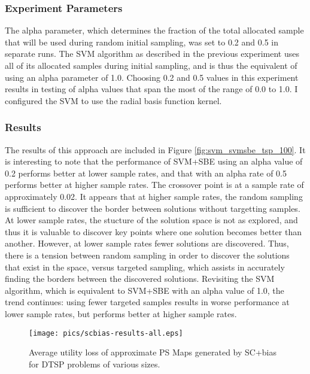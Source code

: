 \subsubsection{Experiment Parameters} 

The alpha parameter, which determines the fraction of the total allocated sample that will be used during random initial sampling, was set to 0.2 and 0.5 in separate runs.  The SVM algorithm as described in the previous experiment uses all of its allocated samples during initial sampling, and is thus the equivalent of using an alpha parameter of 1.0.  Choosing 0.2 and 0.5 values in this experiment results in testing of alpha values that span the most of the range of 0.0 to 1.0.  I configured the SVM to use the radial basis function kernel.

\subsubsection{Results} The results of this approach are included in Figure \ref{fig:svm_svmsbe_tsp_100}.  It is interesting to note that the performance of SVM+SBE using an alpha value of 0.2 performs better at lower sample rates, and that with an alpha rate of 0.5 performs better at higher sample rates.  The crossover point is at a sample rate of approximately 0.02.  It appears that at higher sample rates, the random sampling is sufficient to discover the border between solutions without targetting samples.  At lower sample rates, the stucture of the solution space is not as explored, and thus it is valuable to discover key points where one solution becomes better than another.  However, at lower sample rates fewer solutions are discovered.  Thus, there is a tension between random sampling in order to discover the solutions that exist in the space, versus targeted sampling, which assists in accurately finding the borders between the discovered solutions.  Revisiting the SVM algorithm, which is equivalent to SVM+SBE with an alpha value of 1.0, the trend continues:  using fewer targeted samples results in worse performance at lower sample rates, but performs better at higher sample rates.




\begin{figure}
\begin{center}
\texttt{[image: pics/scbias-results-all.eps]}
\caption{Average utility loss of approximate PS Maps generated by SC+bias for DTSP problems of various sizes.}
\label{fig:scbias-results-all}
\end{center}
\end{figure}

